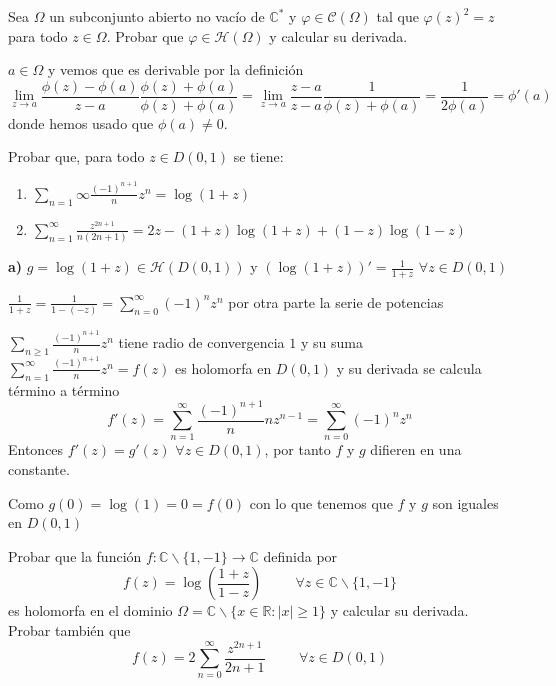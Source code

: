 \begin{ejer}
	Sea $\Omega$ un subconjunto abierto no vacío de $\mathbb{C}^{\ast}$ y $\varphi\in\mathcal{C}(\Omega)$ tal que $\varphi(z)^2 = z$ para todo $z\in\Omega$. Probar que $\varphi\in\mathcal{H}(\Omega)$ y calcular su derivada.
\end{ejer}

\begin{sol}
	$a\in\Omega$ y vemos que es derivable por la definición
	$$\lim_{z\rightarrow a} \frac{\phi(z)-\phi(a)}{z-a} \frac{\phi(z)+\phi(a)}{\phi(z)+\phi(a)} = \lim_{z\rightarrow a} \frac{z-a}{z-a} \frac{1}{\phi(z)+\phi(a)} = \frac{1}{2\phi(a)} = \phi '(a)$$
	donde hemos usado que $\phi(a)\not = 0$.
	
\end{sol}



\begin{ejer}
	Probar que, para todo $z \in D(0, 1)$ se tiene:
	\begin{enumerate}[label=(\alph*)]
		\item $\sum_{n=1}{\infty} \frac{(-1)^{n+1}}{n} z^n = \log(1+z)$
		\item $\sum_{n=1}^{\infty} \frac{z^{2n+1}}{n(2n+1)} = 2z-(1+z)\log(1+z)+(1-z)\log(1-z)$
	\end{enumerate}
\end{ejer}

\begin{sol}
	
	\textbf{a)}
	$g = \log (1+z) \in\mathcal{H}(D(0,1))$ y $(\log (1+z))' = \frac{1}{1+z}$ $\forall z\in D(0,1)$
	
	$\frac{1}{1+z} = \frac{1}{1-(-z)} = \sum_{n=0}^{\infty} (-1)^n z^n$
	por otra parte la serie de potencias 
	
	$\sum_{n\geq 1} \frac{(-1)^{n+1}}{n} z^n$ tiene radio de convergencia $1$
	y su suma $\sum_{n=1}^{\infty} \frac{(-1)^{n+1}}{n} z^n = f(z)$ es holomorfa en $D(0,1)$ y su derivada se calcula término a término
	$$f'(z) = \sum_{n=1}^{\infty} \frac{(-1)^{n+1}}{n} n z^{n-1} = \sum_{n=0}^{\infty} (-1)^{n}z^{n}$$
	Entonces $f'(z) = g'(z)$ $\forall z\in D(0,1)$, por tanto $f$ y $g$ difieren en una constante.
	
	Como $g(0) = \log(1) = 0 = f(0)$
	con lo que tenemos que $f$ y $g$ son iguales en $D(0,1)$
	
\end{sol}




\begin{ejer}
	Probar que la función $f:\mathbb{C}\backslash\{1,-1\}\rightarrow\mathbb{C}$ definida por
	$$ f(z) = \log\left( \frac{1+z}{1-z} \right) \hspace{1cm} \forall z\in\mathbb{C}\backslash\{1,-1\} $$
	es holomorfa en el dominio $\Omega = \mathbb{C}\backslash\{ x\in\mathbb{R} : |x|\geq 1 \}$ y calcular su derivada. Probar también que
	$$ f(z) = 2\sum_{n=0}^{\infty} \frac{z^{2n+1}}{2n+1} \hspace{1cm} \forall z\in D(0,1) $$
\end{ejer}



